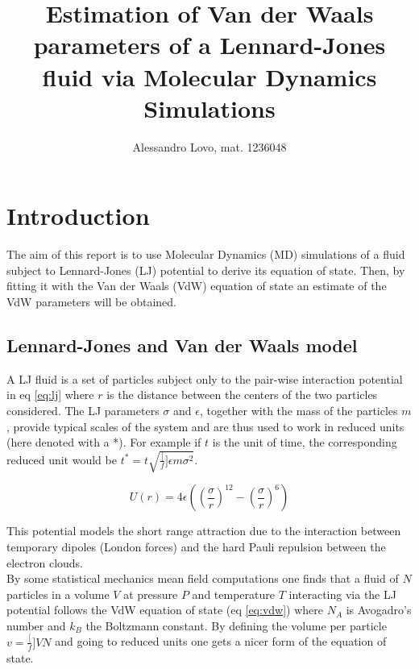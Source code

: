 \documentclass[a4paper, 11pt]{article}
\begin{document}
\title{Estimation of Van der Waals parameters of a Lennard-Jones fluid via Molecular Dynamics Simulations}
\author{Alessandro Lovo, mat. 1236048}

\maketitle

\section{Introduction}
  The aim of this report is to use Molecular Dynamics (MD) simulations of a fluid subject to Lennard-Jones (LJ) potential to derive its equation of state. Then, by fitting it with the Van der Waals (VdW) equation of state an estimate of the VdW parameters will be obtained.

  \subsection{Lennard-Jones and Van der Waals model}
    A LJ fluid is a set of particles subject only to the pair-wise interaction potential in eq \ref{eq:lj} where $r$ is the distance between the centers of the two particles considered. The LJ parameters $\sigma$ and $\epsilon$, together with the mass of the particles $m$, provide typical scales of the system and are thus used to work in reduced units (here denoted with a *). For example if $t$ is the unit of time, the corresponding reduced unit would be $t^* = t \sqrt{\frac[f]{\epsilon}{m\sigma^2}}$.

    \begin{equation} \label{eq:lj}
      U(r) = 4\epsilon\left(\left(\frac{\sigma}{r} \right)^{12} - \left(\frac{\sigma}{r} \right)^6 \right)
    \end{equation}

    This potential models the short range attraction due to the interaction between temporary dipoles (London forces) and the hard Pauli repulsion between the electron clouds.\\
    By some statistical mechanics mean field computations one finds that a fluid of $N$ particles in a volume $V$ at pressure $P$ and temperature $T$ interacting via the LJ potential follows the VdW equation of state (eq \ref{eq:vdw}) where $N_A$ is Avogadro's number and $k_B$ the Boltzmann constant. By defining the volume per particle $v = \frac[f]{V}{N}$ and going to reduced units one gets a nicer form of the equation of state.
\end{document}

